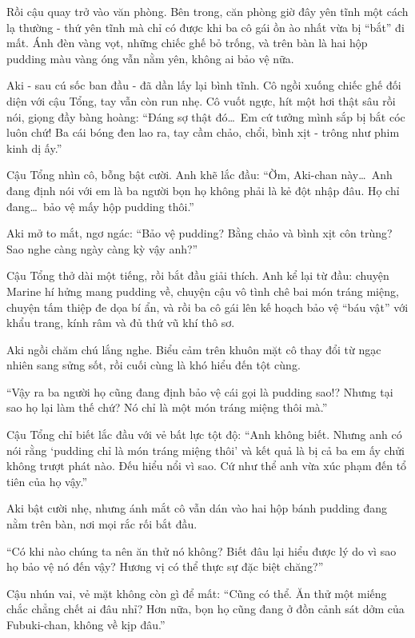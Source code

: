 \documentclass[../main.tex]{subfiles}
\begin{document}
Rồi cậu quay trở vào văn phòng. Bên trong, căn phòng giờ đây yên tĩnh một cách lạ thường - thứ yên tĩnh mà chỉ có được khi ba cô gái ồn ào nhất vừa bị ``bắt'' đi mất. Ánh đèn vàng vọt, những chiếc ghế bỏ trống, và trên bàn là hai hộp pudding màu vàng óng vẫn nằm yên, không ai bảo vệ nữa.

Aki - sau cú sốc ban đầu - đã dần lấy lại bình tĩnh. Cô ngồi xuống chiếc ghế đối diện với cậu Tổng, tay vẫn còn run nhẹ. Cô vuốt ngực, hít một hơi thật sâu rồi nói, giọng đầy bàng hoàng: ``Đáng sợ thật đó\dots\ Em cứ tưởng mình sắp bị bắt cóc luôn chứ! Ba cái bóng đen lao ra, tay cầm chảo, chổi, bình xịt - trông như phim kinh dị ấy.''

Cậu Tổng nhìn cô, bỗng bật cười. Anh khẽ lắc đầu: ``Ờm, Aki-chan này\dots\ Anh đang định nói với em là ba người bọn họ không phải là kẻ đột nhập đâu. Họ chỉ đang\dots\ bảo vệ mấy hộp pudding thôi.''

Aki mở to mắt, ngơ ngác: ``Bảo vệ pudding? Bằng chảo và bình xịt côn trùng? Sao nghe càng ngày càng kỳ vậy anh?''

Cậu Tổng thở dài một tiếng, rồi bắt đầu giải thích. Anh kể lại từ đầu: chuyện Marine hí hửng mang pudding về, chuyện cậu vô tình chê bai món tráng miệng, chuyện tấm thiệp đe dọa bí ẩn, và rồi ba cô gái lên kế hoạch bảo vệ ``báu vật'' với khẩu trang, kính râm và đủ thứ vũ khí thô sơ.

Aki ngồi chăm chú lắng nghe. Biểu cảm trên khuôn mặt cô thay đổi từ ngạc nhiên sang sửng sốt, rồi cuối cùng là khó hiểu đến tột cùng.

``Vậy ra ba người họ cũng đang định bảo vệ cái gọi là pudding sao!? Nhưng tại sao họ lại làm thế chứ? Nó chỉ là một món tráng miệng thôi mà.''

Cậu Tổng chỉ biết lắc đầu với vẻ bất lực tột độ: ``Anh không biết. Nhưng anh có nói rằng `pudding chỉ là món tráng miệng thôi' và kết quả là bị cả ba em ấy chửi không trượt phát nào. Đếu hiểu nổi vì sao. Cứ như thể anh vừa xúc phạm đến tổ tiên của họ vậy.''

Aki bật cười nhẹ, nhưng ánh mắt cô vẫn dán vào hai hộp bánh pudding đang nằm trên bàn, nơi mọi rắc rối bắt đầu.

``Có khi nào chúng ta nên ăn thử nó không? Biết đâu lại hiểu được lý do vì sao họ bảo vệ nó đến vậy? Hương vị có thể thực sự đặc biệt chăng?''

Cậu nhún vai, vẻ mặt không còn gì để mất: ``Cũng có thể. Ăn thử một miếng chắc chẳng chết ai đâu nhỉ? Hơn nữa, bọn họ cũng đang ở đồn cảnh sát dởm của Fubuki-chan, không về kịp đâu.''
\end{document}
